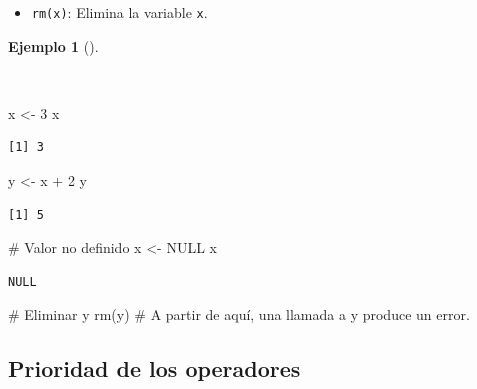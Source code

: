 \documentclass[
  a4paper,
]{scrreport}
\newenvironment{Shaded}{\begin{snugshade}}{\end{snugshade}}
\newcommand{\CommentTok}[1]{\textcolor[rgb]{0.37,0.37,0.37}{#1}}
\newcommand{\ConstantTok}[1]{\textcolor[rgb]{0.56,0.35,0.01}{#1}}
\newcommand{\DecValTok}[1]{\textcolor[rgb]{0.68,0.00,0.00}{#1}}
\newcommand{\FunctionTok}[1]{\textcolor[rgb]{0.28,0.35,0.67}{#1}}
\newcommand{\NormalTok}[1]{\textcolor[rgb]{0.00,0.23,0.31}{#1}}
\newcommand{\OtherTok}[1]{\textcolor[rgb]{0.00,0.23,0.31}{#1}}
\newcommand{\SpecialCharTok}[1]{\textcolor[rgb]{0.37,0.37,0.37}{#1}}
\providecommand{\tightlist}{%
  \setlength{\itemsep}{0pt}\setlength{\parskip}{0pt}}\usepackage{longtable,booktabs,array}
\theoremstyle{definition}
\theoremstyle{definition}
\newtheorem{example}{Ejemplo}[chapter]
\theoremstyle{remark}
\begin{document}
\begin{itemize}
\tightlist
\item
  \texttt{rm(x)}: Elimina la variable \texttt{x}.
\end{itemize}

\begin{example}[]\protect\hypertarget{exm-variables}{}\label{exm-variables}

~

\begin{Shaded}
\begin{Highlighting}[]
\NormalTok{x }\OtherTok{\textless{}{-}} \DecValTok{3}
\NormalTok{x}
\end{Highlighting}
\end{Shaded}

\begin{verbatim}
[1] 3
\end{verbatim}

\begin{Shaded}
\begin{Highlighting}[]
\NormalTok{y }\OtherTok{\textless{}{-}}\NormalTok{ x }\SpecialCharTok{+} \DecValTok{2}
\NormalTok{y}
\end{Highlighting}
\end{Shaded}

\begin{verbatim}
[1] 5
\end{verbatim}

\begin{Shaded}
\begin{Highlighting}[]
\CommentTok{\# Valor no definido}
\NormalTok{x }\OtherTok{\textless{}{-}} \ConstantTok{NULL}
\NormalTok{x}
\end{Highlighting}
\end{Shaded}

\begin{verbatim}
NULL
\end{verbatim}

\begin{Shaded}
\begin{Highlighting}[]
\CommentTok{\# Eliminar y}
\FunctionTok{rm}\NormalTok{(y)}
\CommentTok{\# A partir de aquí, una llamada a y produce un error.}
\end{Highlighting}
\end{Shaded}

\end{example}

\hypertarget{prioridad-de-los-operadores}{%
\subsection{Prioridad de los
operadores}\label{prioridad-de-los-operadores}}
\end{document}
